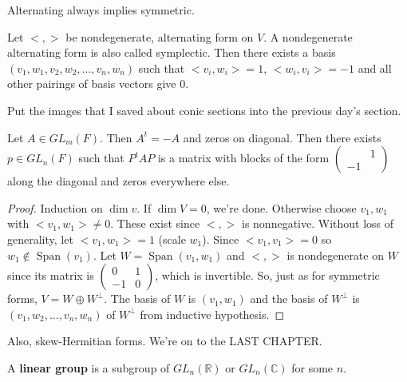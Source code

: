 \documentclass{article}
\newcommand{\vocab}[1]{\textbf{\color{blue!90}\boldmath #1}}
\newcommand{\C}{\mathbb{C}}
\newcommand{\R}{\mathbb{R}}
\DeclareMathOperator{\Span}{Span}
\begin{document}
Alternating always implies symmetric.
\begin{theorem}
Let $<,>$ be nondegenerate, alternating form on $V$. A nondegenerate alternating form is also called symplectic. Then there exists a basis $(v_1,w_1,v_2,w_2,...,v_n,w_n)$ such that $<v_i,w_i>=1$, $<w_i,v_i>=-1$ and all other pairings of basis vectors give 0.
\end{theorem}
\begin{remark}
Put the images that I saved about conic sections into the previous day's section. 
\end{remark}
\begin{theorem}
Let $A\in GL_m(F)$. Then $A^t=-A$ and zeros on diagonal. Then there exists $p\in GL_n(F)$ such that $P^tAP$ is a matrix with blocks of the form $\begin{pmatrix}&1\\-1&\end{pmatrix}$ along the diagonal and zeros everywhere else.
\end{theorem}
\begin{proof}
Induction on $\dim v$. If $\dim V=0$, we're done. Otherwise choose $v_1,w_1$ with $<v_1,w_1>\neq 0$. These exist since $<,>$ is nonnegative. Without loss of generality, let $<v_1,w_1>=1$ (scale $w_1$). Since $<v_1,v_1>=0$ so $w_1\notin \Span(v_1)$. Let $W=\Span(v_1,w_1)$ and $<,>$ is nondegenerate on $W$ since its matrix is $\begin{pmatrix}0&1\\-1&0\end{pmatrix}$, which is invertible. So, just as for symmetric forms, $V=W\oplus W^\perp$. The basis of $W$ is $(v_1,w_1)$ and the basis of $W^\perp$ is $(v_1,w_2,...,v_n,w_n)
$ of $W^\perp$ from inductive hypothesis.
\end{proof}
Also, skew-Hermitian forms. We're on to the LAST CHAPTER.
\begin{definition}
A \vocab{linear group} is a subgroup of $GL_n(\R)$ or $GL_n(\C)$ for some $n$.
\end{definition}
\end{document}
